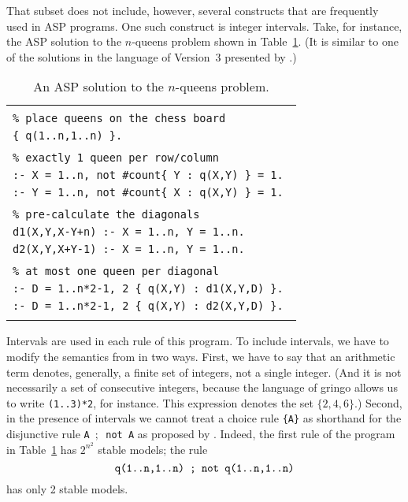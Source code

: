 \documentclass{tlp}
\begin{document}
That subset does not include, however, several constructs that are frequently
used in ASP programs.  One such construct is integer intervals.
Take, for instance, the ASP solution
to the $n$-queens problem shown in Table~\ref{Kappa}. (It is similar to one of
the solutions in the language of Version~3 presented by 
\citeyear{geb11b}.)
\begin{table}\label{Kappa}
\begin{tabular}{l}
  \hline
  \\
  {\tt \% place queens on the chess board}\\
  {\tt \{ q(1..n,1..n) \}.}\\
  \\
  {\tt \% exactly 1 queen per row/column}\\
  {\tt :- X = 1..n, not \#count\{ Y : q(X,Y) \} = 1. }\\
  {\tt :- Y = 1..n, not \#count\{ X : q(X,Y) \} = 1. }\\
  \\
  {\tt \% pre-calculate the diagonals}\\
  {\tt d1(X,Y,X-Y+n) :- X = 1..n, Y = 1..n. }\\
  {\tt d2(X,Y,X+Y-1) :- X = 1..n, Y = 1..n. }\\
  \\
  {\tt \% at most one queen per diagonal}\\
  {\tt :- D = 1..n*2-1, 2 \{ q(X,Y) : d1(X,Y,D) \}. }\\
  {\tt :- D = 1..n*2-1, 2 \{ q(X,Y) : d2(X,Y,D) \}. }\\
  \\
  \hline
\end{tabular}
\caption{An ASP solution to the $n$-queens problem.}
\end{table}
Intervals are used in each rule of this program.  To include intervals, we
have to modify the semantics from  \citeyear{har14a} in
two ways.  First,
we have to say that an arithmetic term denotes, generally, a finite set
of integers, not a single integer.   (And it is not necessarily a set
of consecutive integers, because the language of {\sc gringo} allows us to
write {\tt (1..3)*2}, for instance.  This expression denotes the set
$\{2,4,6\}$.)  Second, in the presence of intervals we cannot treat a choice
rule  {\tt \{A\}} as shorthand for the disjunctive rule
{\tt A $\!;\!$ not$\!$ A}
as proposed by  \citeyear{fer05b}.  Indeed, the first rule of
the program in
Table~\ref{Kappa} has $2^{n^2}$ stable models; the rule
$$\hbox{\tt q(1..n,1..n) ; not  q(1..n,1..n)}$$
has only 2 stable models.
\end{document}
